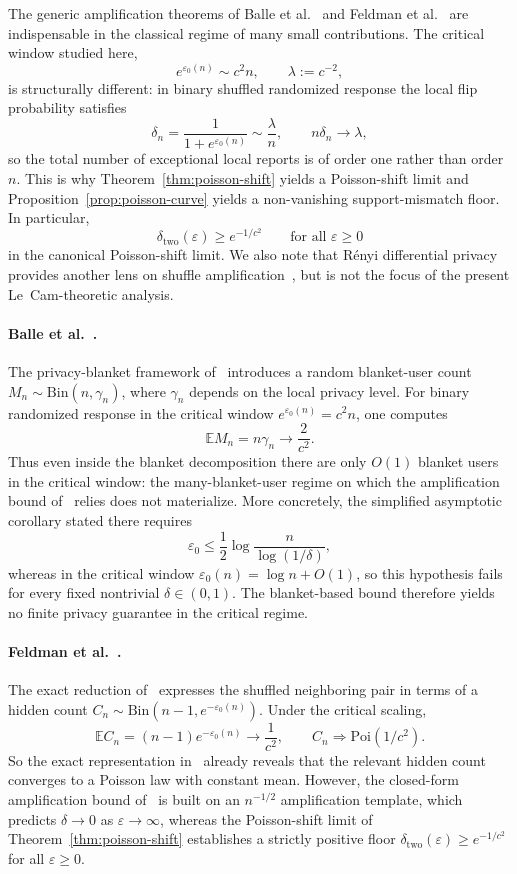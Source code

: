 \documentclass{article}
\begin{document}
The generic amplification theorems of Balle et al.~\cite{BBG19} and Feldman et al.~\cite{FMT21}
are indispensable in the classical regime of many small contributions. The critical window studied
here,
\[
e^{\varepsilon_0(n)}\sim c^2 n,
\qquad
\lambda:=c^{-2},
\]
is structurally different: in binary shuffled randomized response the local flip probability satisfies
\[
\delta_n=\frac{1}{1+e^{\varepsilon_0(n)}}\sim \frac{\lambda}{n},
\qquad
n\delta_n\to \lambda,
\]
so the total number of exceptional local reports is of order one rather than order $n$. This is why
Theorem~\ref{thm:poisson-shift} yields a Poisson-shift limit and Proposition~\ref{prop:poisson-curve}
yields a non-vanishing support-mismatch floor. In particular,
\[
\delta_{\mathrm{two}}(\varepsilon)\ge e^{-1/c^2}
\qquad \text{for all } \varepsilon\ge 0
\]
in the canonical Poisson-shift limit. We also note that Rényi differential privacy~\cite{Mir17}
provides another lens on shuffle amplification~\cite{GKL21}, but is not the focus of the present
Le~Cam-theoretic analysis.

\paragraph{Balle et al.~\cite{BBG19}.}
The privacy-blanket framework of~\cite{BBG19} introduces a random blanket-user count
$M_n\sim \mathrm{Bin}(n,\gamma_n)$, where $\gamma_n$ depends on the local privacy level. For
binary randomized response in the critical window $e^{\varepsilon_0(n)}=c^2 n$, one computes
\[
\mathbb E M_n = n\gamma_n \to \frac{2}{c^2}.
\]
Thus even inside the blanket decomposition there are only $O(1)$ blanket users in the critical
window: the many-blanket-user regime on which the amplification bound of~\cite{BBG19} relies
does not materialize. More concretely, the simplified asymptotic corollary stated there requires
\[
\varepsilon_0 \le \frac{1}{2}\log\frac{n}{\log(1/\delta)},
\]
whereas in the critical window $\varepsilon_0(n)=\log n + O(1)$, so this hypothesis fails for every
fixed nontrivial $\delta\in(0,1)$. The blanket-based bound therefore yields no finite
privacy guarantee in the critical regime.

\paragraph{Feldman et al.~\cite{FMT21}.}
The exact reduction of~\cite{FMT21} expresses the shuffled neighboring pair in terms of a hidden
count $C_n\sim \mathrm{Bin}(n-1,e^{-\varepsilon_0(n)})$. Under the critical scaling,
\[
\mathbb E C_n=(n-1)e^{-\varepsilon_0(n)}\to \frac{1}{c^2},
\qquad
C_n\Longrightarrow \mathrm{Poi}(1/c^2).
\]
So the exact representation in~\cite{FMT21} already reveals that the relevant hidden count
converges to a Poisson law with constant mean. However, the closed-form amplification bound
of~\cite{FMT21} is built on an $n^{-1/2}$ amplification template, which predicts
$\delta\to 0$ as $\varepsilon\to\infty$, whereas the Poisson-shift limit of
Theorem~\ref{thm:poisson-shift} establishes a strictly positive floor
$\delta_{\mathrm{two}}(\varepsilon)\ge e^{-1/c^2}$ for all $\varepsilon\ge 0$.
\end{document}
